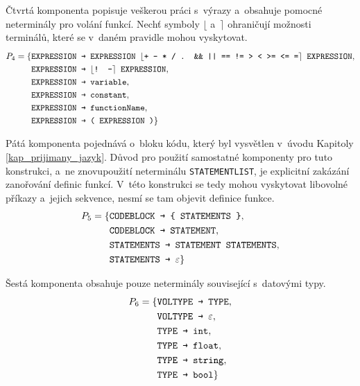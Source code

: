 Čtvrtá komponenta popisuje veškerou práci s~výrazy a~obsahuje pomocné neterminály pro volání funkcí.
Nechť symboly $\lfloor$ a~$\rceil$ ohraničují možnosti terminálů, které se v~daném pravidle mohou vyskytovat.
\begin{equation*}
    P_4 = \{ 
        \begin{aligned}[t] 
            &\texttt{EXPRESSION \textrightarrow{} } \texttt{EXPRESSION } \lfloor \texttt{+ - * / . \&\& || == != > < >= <= =}\rceil \texttt{ EXPRESSION},\\
            &\texttt{EXPRESSION \textrightarrow{} } \lfloor \texttt{! -} \rceil \texttt{ EXPRESSION}, \\
            &\texttt{EXPRESSION \textrightarrow{} } \texttt{variable},\\
            &\texttt{EXPRESSION \textrightarrow{} } \texttt{constant},\\
            &\texttt{EXPRESSION \textrightarrow{} } \texttt{functionName},\\
            &\texttt{EXPRESSION \textrightarrow{} } \texttt{( EXPRESSION )} \}
        \end{aligned}
\end{equation*}

Pátá komponenta pojednává o~bloku kódu, který byl vysvětlen v~úvodu Kapitoly \ref{kap_prijimany_jazyk}.
Důvod pro použití samostatné komponenty pro tuto konstrukci, a~ne znovupoužití neterminálu \texttt{STATEMENT\textunderscore LIST}, je explicitní zakázání zanořování definic funkcí.
V~této konstrukci se tedy mohou vyskytovat libovolné příkazy a~jejich sekvence, nesmí se tam objevit definice funkce. 
\begin{equation*}
    P_5 = \{ 
        \begin{aligned}[t] 
            &\texttt{CODEBLOCK \textrightarrow{} } \texttt{\{ STATEMENTS \}},\\
            &\texttt{CODEBLOCK \textrightarrow{} } \texttt{STATEMENT}, \\
            &\texttt{STATEMENTS \textrightarrow{} } \texttt{STATEMENT STATEMENTS},\\
            &\texttt{STATEMENTS \textrightarrow{} } \varepsilon \}
        \end{aligned}
\end{equation*}

Šestá komponenta obsahuje pouze neterminály související s~datovými typy.
\begin{equation*}
    P_6 = \{ 
        \begin{aligned}[t] 
            &\texttt{VOLTYPE \textrightarrow{} } \texttt{TYPE},\\
            &\texttt{VOLTYPE \textrightarrow{} } \varepsilon, \\
            &\texttt{TYPE \textrightarrow{} } \texttt{int},\\
            &\texttt{TYPE \textrightarrow{} } \texttt{float},\\
            &\texttt{TYPE \textrightarrow{} } \texttt{string},\\
            &\texttt{TYPE \textrightarrow{} } \texttt{bool} \}
        \end{aligned}
\end{equation*}


